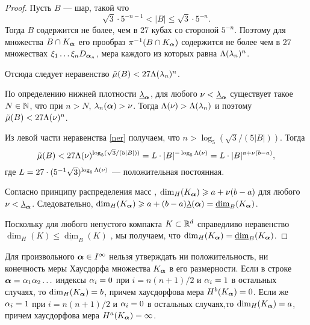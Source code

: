 \begin{proof}
Пусть $B$ --- шар, такой что
\begin{equation}\label{ner}{\sqrt{3}}\cdot 5^{-n-1}<|B|\le{\sqrt{3}}\cdot 5^{-n}.
\end{equation}
Тогда $B$ содержится не более, чем в 27 кубах со стороной $5^{-n}$. 
Поэтому для множества $B\cap K_{\bm{\alpha}}$  его прообраз $\pi^{-1}(B\cap K_{\bm{\alpha}})$ содержится не более чем в 27 множествах  $\xi_1\ldots \xi_n D_{{\bm{\alpha}}_n}$, мера каждого из которых равна $\Lambda(\lambda_n)^n$.

Отсюда следует неравенство $\tilde\mu(B)<27\Lambda(\lambda_n)^n$.

По определению нижней плотности $\underline{\lambda}_{\bm{\alpha}}$, для любого $\nu<\underline{\lambda}_{\bm{\alpha}}$ существует такое $N\in\mathbb{N}$, что при $n>N$, $\lambda_n({\bm{\alpha}}) > \nu$. 
Тогда $\Lambda(\nu)>\Lambda(\lambda_n)$  и поэтому  $\tilde\mu(B)<27\Lambda(\nu)^n$.

Из левой части неравенства \eqref{ner} получаем, что $n>\log_5(\sqrt{3}/(5|B|))$.
Тогда 
\begin{equation}
\tilde\mu(B)<27 \Lambda(\nu)^{\log_5(\sqrt{3}/(5|B|))}=L\cdot|B|^{-\log_5{\Lambda(\nu)}} =L\cdot |B|^{a+\nu(b-a)},
\end{equation}
где $L=27\cdot(5^{-1}\sqrt{3})^{\log_5{\Lambda(\nu)}}$ --- положительная постоянная.

Согласно принципу распределения масс \cite[Mass distribution Principle~4.2, p.55]{Falconer2004}, $\dim_H(K_{\bm{\alpha}})\geqslant a+\nu(b-a)$ для любого $\nu<\underline{\lambda}_{\bm{\alpha}}$.
Следовательно, $\dim_H(K_{\bm{\alpha}})\geqslant  a+(b-a)\underline{\lambda}({\bm{\alpha}}) =\underline{\dim}_B(K_{\bm{\alpha}})$.

Поскольку  для любого непустого компакта $K\subset\mathbb{R}^d$ справедливо неравенство $\dim_H(K)\leqslant\underline{\dim}_B(K)$ \cite[(3.17), p.~43]{Falconer2004}, мы получаем, что $\dim_H( K_{\bm{\alpha}})=\underline{\dim}_B( K_{\bm{\alpha}})$.
\end{proof}

\begin{remark} 
Для произвольного ${\bm{\alpha}}\in I^\infty$ нельзя утверждать ни положительность, ни конечность меры Хаусдорфа множества $K_{\bm{\alpha}}$ в его размерности. 
Если в строке ${\bm{\alpha}}=\alpha_1\alpha_2\ldots$ индексы $\alpha_i=0$ при  $i=n(n+1)/2$ и $\alpha_i=1$ в остальных случаях, то $\dim_H(K_{\bm{\alpha}})=b$, причем хаусдорфова мера $H^b(K_{\bm{\alpha}})=0$.
Если же $\alpha_i=1$ при  $i=n(n+1)/2$ и $\alpha_i=0$ в остальных случаях,то $\dim_H(K_{\bm{\alpha}})=a$, причем хаусдорфова мера $H^a(K_{\bm{\alpha}})=\infty$.
\end{remark}
 
 
 
 